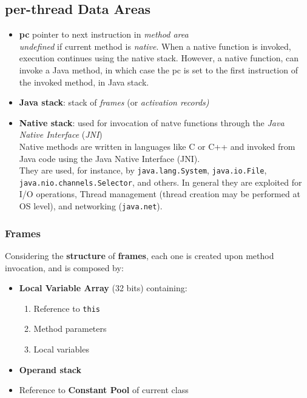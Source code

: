 \subsection{per-thread Data Areas}
\begin{itemize}
    \item \textbf{pc} pointer to next instruction in \textit{method area}\\
    \textit{undefined }if current method is \textit{native}. When a native function is invoked, execution continues using the native stack. However, a native function, can invoke a Java method, in which case the pc is set to the first instruction of the invoked method, in Java stack.
    
    \item \textbf{Java stack}: stack of \textit{frames} (or \textit{activation records)}
    \item \textbf{Native stack}: used for invocation of natve functions through the \textit{Java Native Interface} (\textit{JNI})\\
    Native methods are written in languages like C or C++ and invoked from Java code using the Java Native Interface (JNI).\\
    They are used, for instance, by \texttt{java.lang.System}, \texttt{java.io.File}, \texttt{java.nio.channels.Selector}, and others. In general they are exploited for I/O operations, Thread management (thread creation may be performed at OS level), and networking (\texttt{java.net}).
\end{itemize}

\subsubsection{Frames}
{Considering the \textbf{structure} of \textbf{frames}, each one is created upon method invocation, and  is composed by:\ns
\begin{itemize}
    \item \textbf{Local Variable Array} (32 bits) containing:
    \begin{enumerate}
        \item Reference to \lstinline{this}
        \item Method parameters
        \item Local variables
    \end{enumerate}
    \item \textbf{Operand stack}
    \item Reference to \textbf{Constant Pool} of current class
\end{itemize}}

